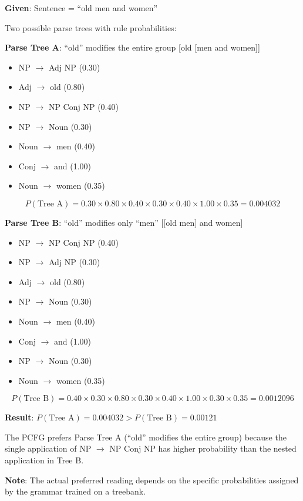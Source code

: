 \documentclass[11pt,a4paper]{article}
\begin{document}
\begin{tcolorbox}[colback=green!5!white,colframe=green!75!black,title=\textbf{Worked Example 33: PCFG Disambiguation}]
\textbf{Given}: Sentence = ``old men and women''

Two possible parse trees with rule probabilities:

\textbf{Parse Tree A}: ``old'' modifies the entire group [old [men and women]]
\begin{itemize}
    \item NP $\to$ Adj NP (0.30)
    \item Adj $\to$ old (0.80)
    \item NP $\to$ NP Conj NP (0.40)
    \item NP $\to$ Noun (0.30)
    \item Noun $\to$ men (0.40)
    \item Conj $\to$ and (1.00)
    \item Noun $\to$ women (0.35)
\end{itemize}

\[
P(\text{Tree A}) = 0.30 \times 0.80 \times 0.40 \times 0.30 \times 0.40 \times 1.00 \times 0.35 = 0.004032
\]

\textbf{Parse Tree B}: ``old'' modifies only ``men'' [[old men] and women]
\begin{itemize}
    \item NP $\to$ NP Conj NP (0.40)
    \item NP $\to$ Adj NP (0.30)
    \item Adj $\to$ old (0.80)
    \item NP $\to$ Noun (0.30)
    \item Noun $\to$ men (0.40)
    \item Conj $\to$ and (1.00)
    \item NP $\to$ Noun (0.30)
    \item Noun $\to$ women (0.35)
\end{itemize}

\[
P(\text{Tree B}) = 0.40 \times 0.30 \times 0.80 \times 0.30 \times 0.40 \times 1.00 \times 0.30 \times 0.35 = 0.0012096
\]

\textbf{Result}: $P(\text{Tree A}) = 0.004032 > P(\text{Tree B}) = 0.00121$

The PCFG prefers Parse Tree A (``old'' modifies the entire group) because the single application of NP $\to$ NP Conj NP has higher probability than the nested application in Tree B.

\textbf{Note}: The actual preferred reading depends on the specific probabilities assigned by the grammar trained on a treebank.
\end{tcolorbox}
\end{document}
